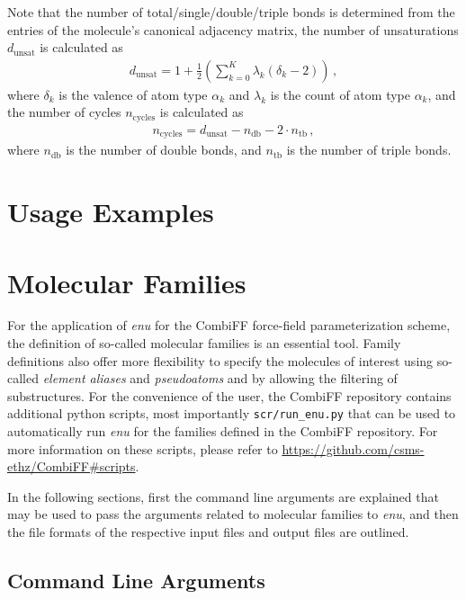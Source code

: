 \documentclass[a4paper,11pt]{article}
\begin{document}
Note that the number of total/single/double/triple bonds is determined from the entries of the molecule's canonical adjacency matrix, the number of unsaturations $d_\text{unsat}$ is calculated as
%
\begin{align}\label{eq:unsaturations}
    d_\text{unsat} = 1 + \frac{1}{2}\left(\sum\limits_{k=0}^{K}\lambda_k(\delta_k-2)\right) \, ,
\end{align}
%
where $\delta_k$ is the valence of atom type $\alpha_k$ and $\lambda_k$ is the count of atom type $\alpha_k$, and the number of cycles $n_\text{cycles}$ is calculated as
%
\begin{align}
  n_\text{cycles} = d_\text{unsat} - n_\text{db} - 2\cdot n_\text{tb} \, ,
\end{align}
%
where $n_\text{db}$ is the number of double bonds, and $n_\text{tb}$ is the number of triple bonds.

\section{Usage Examples}

\section{Molecular Families}

For the application of \textit{enu} for the CombiFF force-field parameterization scheme, the definition of so-called molecular families is an essential tool. Family definitions also offer more flexibility to specify the molecules of interest using so-called \textit{element aliases} and \textit{pseudoatoms} and by allowing the filtering of substructures.\cite{Rieder2022} For the convenience of the user, the CombiFF repository contains additional python scripts, most importantly \texttt{scr/run\_enu.py} that can be used to automatically run \textit{enu} for the families defined in the CombiFF repository. For more information on these scripts, please refer to \url{https://github.com/csms-ethz/CombiFF#scripts}.

In the following sections, first the command line arguments are explained that may be used to pass the arguments related to molecular families to \textit{enu}, and then the file formats of the respective input files and output files are outlined.

\subsection{Command Line Arguments}
\end{document}
